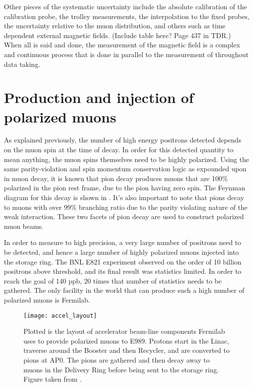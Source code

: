 Other pieces of the systematic uncertainty include the absolute calibration of the calibration probe, the trolley measurements, the interpolation to the fixed probes, the uncertainty relative to the muon distribution, and others such as time dependent external magnetic fields. (Include table here? Page 437 in TDR.) When all is said and done, the measurement of the magnetic field is a complex and continuous process that is done in parallel to the measurement of \wa throughout data taking. 




\section{Production and injection of polarized muons}
\label{sec:Accelerator}

As explained previously, the number of high energy positrons detected depends on the muon spin at the time of decay. In order for this detected quantity to mean anything, the muon spins themselves need to be highly polarized. Using the same parity-violation and spin momentum conservation logic as expounded upon in muon decay, it is known that pion decay produces muons that are 100\% polarized in the pion rest frame, due to the pion having zero spin. The Feynman diagram for this decay is shown in . It's also important to note that pions decay to muons with over 99\% branching ratio due to the parity violating nature of the weak interaction. These two facets of pion decay are used to construct polarized muon beams. 

In order to measure \gmtwo to high precision, a very large number of positrons need to be detected, and hence a large number of highly polarized muons injected into the storage ring. The BNL E821 experiment observed on the order of 10 billion positrons above threshold, and its final result was statistics limited. In order to reach the goal of 140 ppb, 20 times that number of statistics needs to be gathered. The only facility in the world that can produce such a high number of polarized muons is Fermilab. 

\begin{figure}[]
    \centering
    \texttt{[image: accel\_layout]}
    \caption[Fermilab accelerator layout for muon delivery to E989]{Plotted is the layout of accelerator beam-line components Fermilab uses to provide polarized muons to E989. Protons start in the Linac, traverse around the Booster and then Recycler, and are converted to pions at AP0. The pions are gathered and then decay away to muons in the Delivery Ring before being sent to the \gmtwo storage ring. Figure taken from .}   
    \label{fig:accelerator}
\end{figure}

